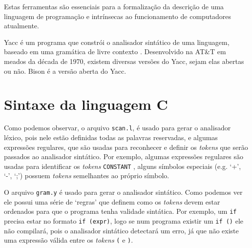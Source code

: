 \documentclass[letterpaper,twocolumn,10pt]{article}
\begin{document}
Estas ferramentas são essenciais para a formalização da descrição de uma
linguagem de programação e intrínsecas ao funcionamento de computadores
atualmente.

Yacc é um programa que constrói o analisador sintático de uma linguagem,
baseado em uma gramática de livre contexto . Desenvolvido na AT\&T em meados da
década de 1970, existem diversas versões do Yacc, sejam elas abertas ou não.
Bison é a versão aberta do Yacc.

\section{Sintaxe da linguagem C}

Como podemos observar, o arquivo \texttt{scan.l}, é usado para gerar o
analisador léxico, pois nele estão definidas todas as palavras reservadas, e
algumas expressões regulares, que são usadas para reconhecer e definir os
\textit{tokens} que serão passados ao analisador sintático. Por exemplo,
algumas expressões regulares são usadas para identificar os \textit{tokens}
\texttt{CONSTANT} , alguns símbolos especiais (e.g. `+', `-', `;') possuem
\textit{tokens} semelhantes ao próprio símbolo.

O arquivo \texttt{gram.y} é usado para gerar o analisador sintático. Como
podemos ver ele possui uma série de `regras' que definem como os
\textit{tokens} devem estar ordenados para que o programa tenha validade
sintática. Por exemplo, um \texttt{if} precisa estar no formato \texttt{if
(expr)}, logo se num programa existir um \texttt{if ()} ele não compilará, pois
o analisador sintático detectará um erro, já que não existe uma expressão
válida entre os \textit{tokens} \texttt{(} e \texttt{)}.
\end{document}
